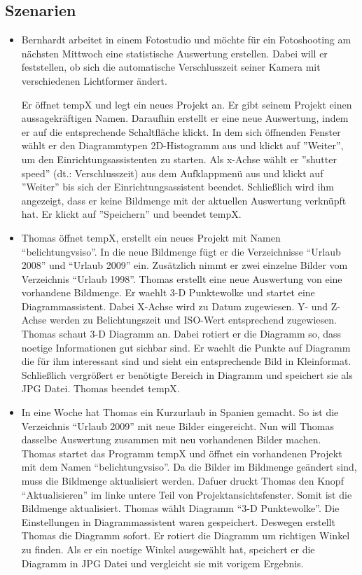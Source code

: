\subsection{Szenarien}

\begin{itemize}
	\item Bernhardt arbeitet in einem Fotostudio und möchte für ein Fotoshooting am nächsten Mittwoch eine statistische Auswertung erstellen. Dabei will er feststellen, ob sich die automatische Verschlusszeit seiner Kamera mit verschiedenen \gls{Lichtformer} ändert.
	
Er öffnet \gls{tempX} und legt ein neues Projekt an. Er gibt seinem Projekt einen aussagekräftigen Namen.  Daraufhin erstellt er eine neue Auswertung, indem er auf die entsprechende Schaltfläche klickt. In dem sich öffnenden Fenster wählt er den Diagrammtypen 2D-Histogramm aus und klickt auf ''Weiter'', um den Einrichtungsassistenten zu starten. Als x-Achse wählt er ''shutter speed'' (dt.: Verschlusszeit) aus dem Aufklappmenü aus und klickt auf ''Weiter'' bis sich der Einrichtungsassistent beendet. Schließlich wird ihm angezeigt, dass er keine Bildmenge mit der aktuellen Auswertung verknüpft hat. Er klickt auf ''Speichern'' und beendet \gls{tempX}. 

	\item Thomas öffnet \gls{tempX}, erstellt ein neues Projekt mit Namen "`belichtungvsiso"'. In die neue Bildmenge fügt er die Verzeichnisse "`Urlaub 2008"' und "`Urlaub 2009"' ein. Zusätzlich nimmt er zwei einzelne Bilder vom Verzeichnis "`Urlaub 1998"'. Thomas erstellt eine neue Auswertung von eine vorhandene Bildmenge. Er waehlt 3-D Punktewolke und startet eine Diagrammassistent. Dabei X-Achse wird zu Datum zugewiesen. Y- und Z-Achse werden zu Belichtungszeit und ISO-Wert entsprechend zugewiesen. Thomas schaut 3-D Diagramm an. Dabei rotiert er die Diagramm so, dass noetige Informationen gut sichbar sind. Er waehlt die Punkte auf Diagramm die für ihm interessant sind und sieht ein entsprechende Bild in Kleinformat. Schließlich vergrößert er benötigte Bereich in Diagramm und speichert sie als JPG Datei. Thomas beendet \gls{tempX}. 

\item In eine Woche hat Thomas ein Kurzurlaub in Spanien gemacht. So ist die Verzeichnis "`Urlaub 2009"' mit neue Bilder eingereicht. Nun will Thomas dasselbe Auswertung zusammen mit neu vorhandenen Bilder machen. Thomas startet das Programm \gls{tempX} und öffnet ein vorhandenen Projekt mit dem Namen "`belichtungvsiso"'. Da die Bilder im Bildmenge geändert sind, muss die Bildmenge aktualisiert werden. Dafuer druckt Thomas den Knopf "`Aktualisieren"' im linke untere Teil von Projektansichtsfenster.  Somit ist die Bildmenge aktualisiert. Thomas wählt Diagramm "`3-D Punktewolke"'. Die Einstellungen in Diagrammassistent waren gespeichert. Deswegen erstellt Thomas die Diagramm sofort. Er rotiert die Diagramm um richtigen Winkel zu finden. Als er ein noetige Winkel ausgewählt hat, speichert er die Diagramm in JPG Datei und vergleicht sie mit vorigem Ergebnis. 
\end{itemize}
